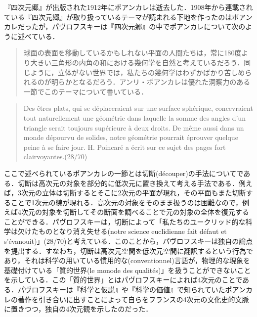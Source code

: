 『四次元郷』が出版された1912年にポアンカレは逝去した．1908年から連載されている『四次元郷』が取り扱っているテーマが読まれる下地を作ったのはポアンカレだったが，パヴロフスキーは『四次元郷』の中でポアンカレについて次のように述べている．
\begin{quote}
球面の表面を移動しているかもしれない平面の人間たちは，常に180度より大きい三角形の内角の和における幾何学を自然と考えているだろう．同じように，立体がない世界では，私たちの幾何学はわずかばかり苦しめられるのが明らかとなるだろう．アンリ・ポアンカレは優れた洞察力のある一節でこのテーマについて書いている．
\end{quote}
\begin{quote}
Des êtres plats, qui se déplaceraient sur une surface sphérique, concevraient tout naturellement une géométrie dans laquelle la somme des angles d'un triangle serait toujours supérieure à deux droits. De même aussi dans un monde dépourvu de solides, notre géométrie pourrait éprouver quelque peine à se faire jour. H. Poincaré a écrit sur ce sujet des pages fort clairvoyantes.(28/70)
\end{quote}
ここで述べられているポアンカレの一節とは切断(découper)の手法についてである．切断は高次元の対象を部分的に低次元に置き換えて考える手法である．例えば，3次元の立体は切断するとそこに2次元の平面が現れ，その平面もまた切断することで1次元の線が現れる．高次元の対象をそのまま扱うのは困難なので，例えば4次元の対象を切断してその断面を調べることで元の対象の全体を復元することができる．パヴロフスキーは，切断によって「私たちのユークリッド的な科学は欠けたものとなり消え失せる(notre science euclidienne fait défaut et s'évanouit)」(28/70)と考えている．このことから，パヴロフスキーは独自の論点を提出する．すなわち，切断は高次元空間を低次元空間に翻訳するという行為であり，それは科学の用いている慣用的な(conventionnel)言語が，物理的な現象を基礎付けている「質的世界(le monode des qualités)」を扱うことができないことを示している．この「質的世界」とはパヴロフスキーによれば4次元のことである．パヴロフスキーは『科学と仮説』や『科学の価値』で知られていたポアンカレの著作を引き合いに出すことによって自らをフランスの4次元の文化史的文脈に置きつつ，独自の4次元観を示したのだった．

